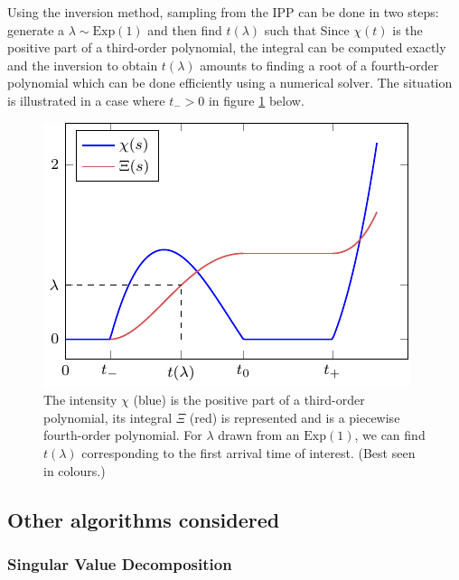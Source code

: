 Using the inversion method, sampling from the IPP can be done in two steps: generate a $\lambda\sim\mathrm{Exp}(1)$ and then find $t(\lambda)$ such that
Since $\chi(t)$ is the positive part of a third-order polynomial, the integral can be computed exactly and the inversion to obtain $t(\lambda)$ amounts to finding a root of a fourth-order polynomial which can be done efficiently using a numerical solver. 
The situation is illustrated in a case where $t_{-}>0$ in figure \ref{fig-lbps-plot} below.
%
\begin{figure}[!h]
\centering
	\includegraphics[width=.7\textwidth]{figures/lbp/pmf_plot}
	\caption{\label{fig-lbps-plot} The intensity $\chi$ (blue) is the positive part of a third-order polynomial, its integral $\Xi$ (red) is represented and is a piecewise fourth-order polynomial. For $\lambda$ drawn from an $\mathrm{Exp}(1)$, we can find $t(\lambda)$ corresponding to the first arrival time of interest. (Best seen in colours.)}
\end{figure}
%



\subsection{Other algorithms considered}

\subsubsection{Singular Value Decomposition}

